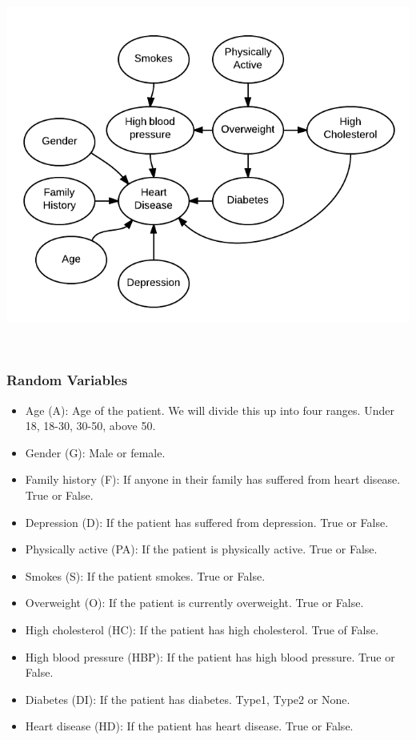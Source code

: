 \documentclass{article}
\begin{document}
\begin{minipage}{\linewidth}
\begin{center}
\includegraphics[scale=0.5]{part3_bn}
\end{center}
\end{minipage}\\

\subsubsection{Random Variables}
\begin{itemize}
\item Age (A): Age of the patient. We will divide this up into four ranges. Under 18, 18-30, 30-50, above 50.
\item Gender (G): Male or female.
\item Family history (F): If anyone in their family has suffered from heart disease. True or False.
\item Depression (D): If the patient has suffered from depression. True or False.
\item Physically active (PA): If the patient is physically active. True or False.
\item Smokes (S): If the patient smokes. True or False.
\item Overweight (O): If the patient is currently overweight. True or False.
\item High cholesterol (HC): If the patient has high cholesterol. True of False.
\item High blood pressure (HBP): If the patient has high blood pressure. True or False.
\item Diabetes (DI): If the patient has diabetes. Type1, Type2 or None.
\item Heart disease (HD): If the patient has heart disease. True or False.
\end{itemize} 
\end{document}

